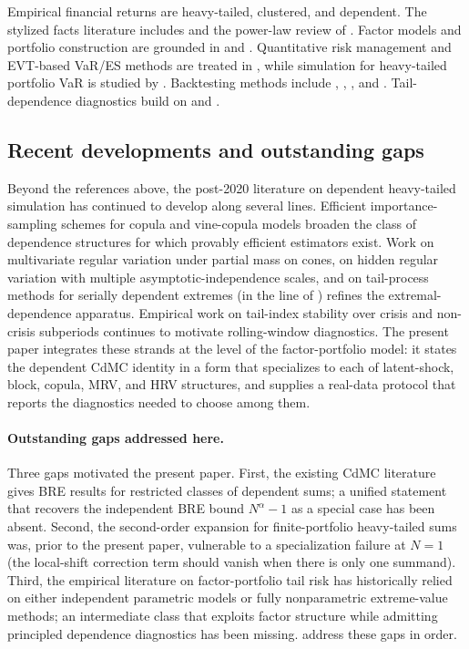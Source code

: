 Empirical financial returns are heavy-tailed, clustered, and dependent. The
stylized facts literature includes \citet{Cont2001} and the power-law review of
\citet{Gabaix2009}. Factor models and portfolio construction are grounded in
\citet{FamaFrench1993} and \citet{FamaFrench2015}. Quantitative risk management
and EVT-based VaR/ES methods are treated in \citet{McNeilFreyEmbrechts2015},
while simulation for heavy-tailed portfolio VaR is studied by
\citet{GlassermanHeidelbergerShahabuddin2002}. Backtesting methods include
\citet{Kupiec1995}, \citet{Christoffersen1998}, \citet{EngleManganelli2004},
and \citet{AcerbiSzekely2014}. Tail-dependence diagnostics build on
\citet{LedfordTawn1996} and \citet{ColesHeffernanTawn1999}.

\subsection{Recent developments and outstanding gaps}
\label{subsec:recent-developments}

Beyond the references above, the post-2020 literature on dependent
heavy-tailed simulation has continued to develop along several lines. Efficient
importance-sampling schemes for copula and vine-copula models
\citep{ChengFuhPang2025} broaden the class of dependence structures for which
provably efficient estimators exist. Work on multivariate regular variation
under partial mass on cones, on hidden regular variation with multiple
asymptotic-independence scales, and on tail-process methods for serially
dependent extremes (in the line of \citet{BasrakSegers2009}) refines the
extremal-dependence apparatus. Empirical work on tail-index stability over
crisis and non-crisis subperiods continues to motivate rolling-window
diagnostics. The present paper integrates these strands at the level of the
factor-portfolio model: it states the dependent CdMC identity in a form that
specializes to each of latent-shock, block, copula, MRV, and HRV structures,
and supplies a real-data protocol that reports the diagnostics needed to
choose among them.

\paragraph{Outstanding gaps addressed here.}
Three gaps motivated the present paper. First, the existing CdMC literature
gives BRE results for restricted classes of dependent sums; a unified
statement that recovers the independent BRE bound $N^\alpha-1$ as a special
case has been absent. Second, the second-order expansion for finite-portfolio
heavy-tailed sums was, prior to the present paper, vulnerable to a
specialization failure at $N=1$ (the local-shift correction term should
vanish when there is only one summand). Third, the empirical literature on
factor-portfolio tail risk has historically relied on either independent
parametric models or fully nonparametric extreme-value methods; an
intermediate class that exploits factor structure while admitting principled
dependence diagnostics has been missing.
address these gaps in order.

